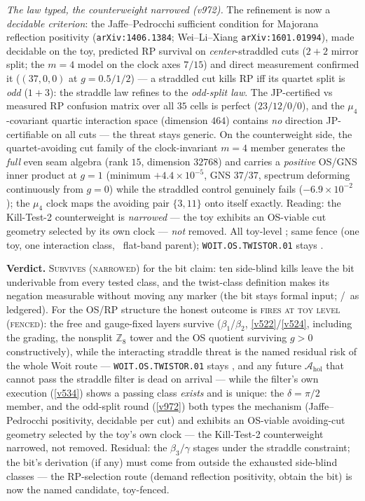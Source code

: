 \documentclass[11pt,a4paper]{article}
\providecommand{\Z}{\mathbb{Z}}
\begin{document}
\begin{gapbox}
\smallskip\noindent\emph{The law typed, the counterweight narrowed (v972).} The refinement is now a
\emph{decidable criterion}: the Jaffe--Pedrocchi sufficient condition for Majorana reflection
positivity (\texttt{arXiv:1406.1384}; Wei--Li--Xiang \texttt{arXiv:1601.01994}), made decidable on
the toy, predicted RP survival on \emph{center}-straddled cuts ($2{+}2$ mirror split; the $m=4$
model on the clock axes $7/15$) and direct measurement confirmed it ($(37,0,0)$ at $g=0.5/1/2$) ---
a straddled cut kills RP iff its quartet split is \emph{odd} ($1{+}3$): the straddle law refines to
the \emph{odd-split law}. The JP-certified vs measured RP confusion matrix over all $35$ cells is
perfect ($23/12/0/0$), and the $\mu_4$-covariant quartic interaction space (dimension $464$)
contains \emph{no} direction JP-certifiable on all cuts --- the threat stays generic. On the
counterweight side, the quartet-avoiding cut family of the clock-invariant $m=4$ member generates
the \emph{full} even seam algebra (rank $15$, dimension $32768$) and carries a \emph{positive}
OS/GNS inner product at $g=1$ (minimum $+4.4\times10^{-5}$, GNS $37/37$, spectrum deforming
continuously from $g=0$) while the straddled control genuinely fails ($-6.9\times10^{-2}$); the
$\mu_4$ clock maps the avoiding pair $\{3,11\}$ onto itself exactly. Reading: the Kill-Test-2
counterweight is \emph{narrowed} --- the toy exhibits an OS-viable cut geometry selected by its own
clock --- \emph{not} removed. All toy-level \mE; same fence (one toy, one interaction class, \mC\
flat-band parent); \texttt{WOIT.OS.TWISTOR.01} stays \mO.
\end{gapbox}

\noindent\textbf{Verdict.} \textsc{Survives (narrowed)} for the bit claim: ten side-blind kills
leave the bit underivable from every tested class, and the twist-class definition makes its
negation measurable without moving any marker (the bit stays formal input; \mC/\mO\ as ledgered).
For the OS/RP structure the honest outcome is \textsc{fires at toy level (fenced)}: the free and
gauge-fixed layers survive ($\beta_1$/$\beta_2$, \vref{v522}/\vref{v524}, including the grading,
the nonsplit $\Z_8$ tower and the OS quotient surviving $g>0$ constructively), while the
interacting straddle threat is the named residual risk of the whole Woit route ---
\texttt{WOIT.OS.TWISTOR.01} stays \mO, and any future $\mathcal A_{\mathrm{hol}}$ that cannot
pass the straddle filter is dead on arrival --- while the filter's own execution (\vref{v534})
shows a passing class \emph{exists} and is unique: the $\delta=\pi/2$ member, and the odd-split
round (\vref{v972}) both types the mechanism (Jaffe--Pedrocchi positivity, decidable per cut) and
exhibits an OS-viable avoiding-cut geometry selected by the toy's own clock --- the Kill-Test-2
counterweight narrowed, not removed. Residual: the
$\beta_3/\gamma$ stages under the straddle constraint; the bit's derivation (if any) must come
from outside the exhausted side-blind classes --- the RP-selection route (demand reflection
positivity, obtain the bit) is now the named candidate, toy-fenced.
\end{document}
